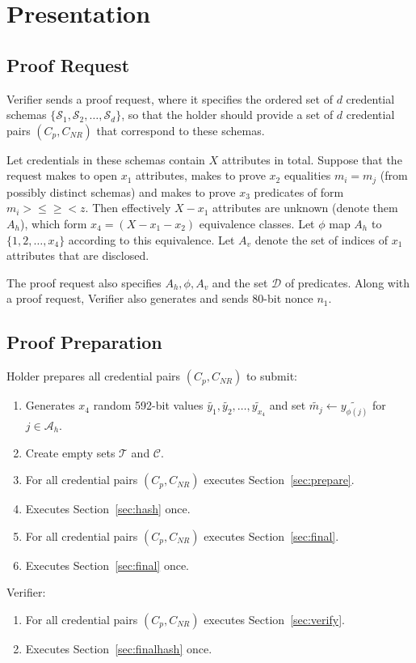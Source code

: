 \section{Presentation}

\subsection{Proof Request}

Verifier sends a proof request, where it specifies the ordered set of $d$ credential schemas
$\{\mathcal{S}_1,\mathcal{S}_2,\ldots,\mathcal{S}_d\}$, so that the holder should provide a set of $d$ credential pairs $(C_p,C_{NR})$ that correspond to these schemas.

Let credentials in these schemas contain $X$ attributes in total. Suppose that the request makes to open $x_1$ attributes, makes to prove $x_2$ equalities $m_i=m_j$ (from possibly distinct schemas) and makes to prove $x_3$ predicates of form  $m_i >\leq \geq<z$. Then effectively $X-x_1$ attributes are unknown (denote them $A_h$), which form $x_4=(X-x_1-x_2)$ equivalence classes. Let $\phi$ map $A_h$ to $\{1,2,\ldots,x_4\}$ according to this equivalence.  Let $A_v$ denote the set of indices of $x_1$ attributes that are disclosed.

The proof request also specifies $A_h,\phi,A_v$ and the set $\mathcal{D}$ of predicates. Along with a proof request, Verifier also generates and sends 80-bit nonce $n_1$.

\subsection{Proof Preparation}
Holder prepares all credential pairs $(C_p,C_{NR})$ to submit:
\begin{enumerate}
\item Generates $x_4$ random 592-bit values $\widetilde{y_1},\widetilde{y_2},
\ldots,\widetilde{y_{x_4}}$ and set $\widetilde{m_j} \leftarrow \widetilde{y_{\phi(j)}} $ for  $j \in \mathcal{A}_{h}$. 
\item
 Create empty sets $\mathcal{T}$ and $\mathcal{C}$.
\item For all credential pairs $(C_p,C_{NR})$ executes Section~\ref{sec:prepare}. 
\item Executes Section~\ref{sec:hash} once. 
\item For all credential pairs $(C_p,C_{NR})$ executes Section~\ref{sec:final}.
\item Executes Section~\ref{sec:final} once.
\end{enumerate}
Verifier:
\begin{enumerate}
\item For all credential pairs $(C_p,C_{NR})$ executes Section~\ref{sec:verify}.
\item Executes Section~\ref{sec:finalhash} once.
\end{enumerate}

